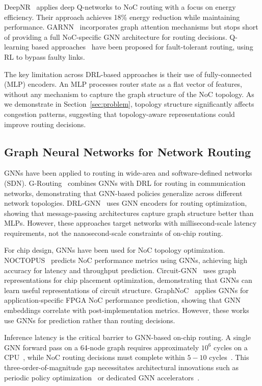 DeepNR~\cite{deepnr2022} applies deep Q-networks to NoC routing with a focus on energy efficiency. Their approach achieves 18\% energy reduction while maintaining performance. GARNN~\cite{garnn2023} incorporates graph attention mechanisms but stops short of providing a full NoC-specific GNN architecture for routing decisions. Q-learning based approaches~\cite{choudhary2026} have been proposed for fault-tolerant routing, using RL to bypass faulty links.

The key limitation across DRL-based approaches is their use of fully-connected (MLP) encoders. An MLP processes router state as a flat vector of features, without any mechanism to capture the graph structure of the NoC topology. As we demonstrate in Section~\ref{sec:problem}, topology structure significantly affects congestion patterns, suggesting that topology-aware representations could improve routing decisions.

\subsection{Graph Neural Networks for Network Routing}

GNNs have been applied to routing in wide-area and software-defined networks (SDN). G-Routing~\cite{g-routing2023} combines GNNs with DRL for routing in communication networks, demonstrating that GNN-based policies generalize across different network topologies. DRL-GNN~\cite{drl-gnn2019} uses GNN encoders for routing optimization, showing that message-passing architectures capture graph structure better than MLPs. However, these approaches target networks with millisecond-scale latency requirements, not the nanosecond-scale constraints of on-chip routing.

For chip design, GNNs have been used for NoC topology optimization. NOCTOPUS~\cite{noctopus2026} predicts NoC performance metrics using GNNs, achieving high accuracy for latency and throughput prediction. Circuit-GNN~\cite{mirhoseini2021} uses graph representations for chip placement optimization, demonstrating that GNNs can learn useful representations of circuit structure. GraphNoC~\cite{graphnoc2024} applies GNNs for application-specific FPGA NoC performance prediction, showing that GNN embeddings correlate with post-implementation metrics. However, these works use GNNs for prediction rather than routing decisions.

Inference latency is the critical barrier to GNN-based on-chip routing. A single GNN forward pass on a 64-node graph requires approximately $10^6$ cycles on a CPU~\cite{xiao2024}, while NoC routing decisions must complete within $5-10$ cycles~\cite{wang2022maar}. This three-order-of-magnitude gap necessitates architectural innovations such as periodic policy optimization~\cite{periodic2025} or dedicated GNN accelerators~\cite{xiao2024}.


